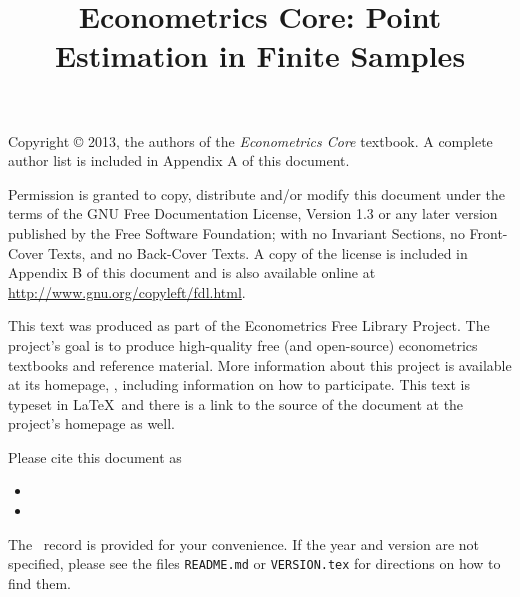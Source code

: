 \documentclass{tex/tufte-handout}
\title{Econometrics Core: Point Estimation in Finite Samples}
\begin{document}
\maketitle

\bigskip\noindent%
Copyright © 2013, the authors of the \textit{Econometrics Core}
textbook.  A complete author list is included in Appendix A of
this document.

Permission is granted to copy, distribute and/or modify this document
under the terms of the GNU Free Documentation License, Version 1.3 or
any later version published by the Free Software Foundation; with no
Invariant Sections, no Front-Cover Texts, and no Back-Cover Texts.  A
copy of the license is included in Appendix B of this document and is
also available online at \url{http://www.gnu.org/copyleft/fdl.html}.

This text was produced as part of the Econometrics Free Library
Project.  The project's goal is to produce high-quality free (and
open-source) econometrics textbooks and reference material.  More
information about this project is available at its homepage,
\homepage, including information on how
to participate.  This text is typeset in \LaTeX\ and there is a link
to the source of the document at the project's homepage as well.

Please cite this document as
\begin{itemize}
\item[] 
\item[] 
\end{itemize}
The \BibTeX\ record is provided for your convenience.
If the year and version are not specified, please see the files
\texttt{README.md} or \texttt{VERSION.tex} for directions on how to
find them.

\tableofcontents









\end{document}
